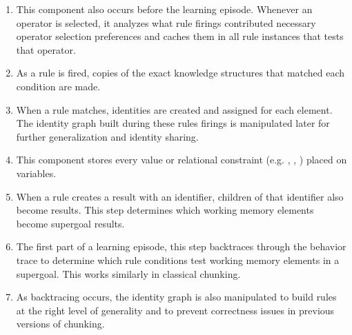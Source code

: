 \begin{enumerate} %

	\item {} \newline
	This component also occurs before the learning episode.  Whenever an operator is selected, it analyzes what rule firings contributed necessary operator selection preferences and caches them in all rule instances that tests that operator.
	
	\item {} \newline
	As a rule is fired, copies of the exact knowledge structures that matched each condition are made. 
	
	\item {} \newline
	When a rule matches, identities are created and assigned for each element. The identity graph built during these rules firings is manipulated later for further generalization and identity sharing.
	
	\item {} \newline
	This component stores every value or relational constraint (e.g. , , ) placed on variables.
	
	\item {} \newline
	When a rule creates a result with an identifier, children of that identifier also become results. This step determines which working memory elements become supergoal results.
	
	\item {} \newline
	The first part of a learning episode, this step backtraces through the behavior trace to determine which rule conditions test working memory elements in a supergoal. This works similarly in classical chunking.
	
	\item {} \newline
	As backtracing occurs, the identity graph is also manipulated to build rules at the right level of generality and to prevent correctness issues in previous versions of chunking.
	

\end{enumerate}

